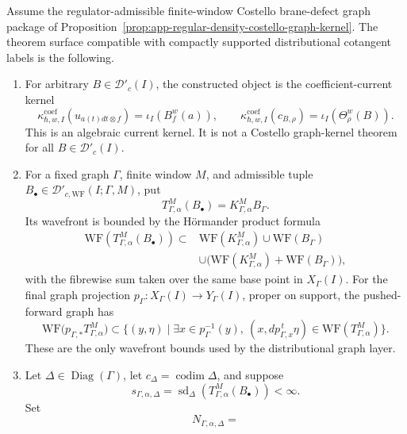 \begin{prop}
\label{prop:app-current-compatible-Dprimec-theorem-surface}
  Assume the regulator-admissible finite-window Costello brane-defect
  graph package of
  Proposition~\ref{prop:app-regular-density-costello-graph-kernel}.  The
  theorem surface compatible with compactly supported distributional
  cotangent labels is the following.
  \begin{enumerate}
    \item For arbitrary \(B\in\mathcal D'_c(I)\), the constructed object
    is the coefficient-current kernel
    \[
      \kappa^{\mathrm{coef}}_{\hbar,w,I}
        (u_{a(t)dt\otimes f})=\iota_I(B^w_f(a)),
      \qquad
      \kappa^{\mathrm{coef}}_{\hbar,w,I}(c_{B,\rho})
        =\iota_I(\Theta^w_\rho(B)).
    \]
    This is an algebraic current kernel.  It is not a Costello
    graph-kernel theorem for all \(B\in\mathcal D'_c(I)\).
    \item For a fixed graph \(\Gamma\), finite window \(M\), and
    admissible tuple
    \(B_\bullet\in\mathcal D'_{c,\mathrm{WF}}(I;\Gamma,M)\), put
    \[
      T^M_{\Gamma,\alpha}(B_\bullet)
        =K^M_{\Gamma,\alpha}B_\Gamma .
    \]
    Its wavefront is bounded by the H\"ormander product formula
    \[
    \begin{aligned}
      \mathrm{WF}\!\left(T^M_{\Gamma,\alpha}(B_\bullet)\right)
      \subset&
      \mathrm{WF}(K^M_{\Gamma,\alpha})
      \cup \mathrm{WF}(B_\Gamma)  \\
      &\cup
      \bigl(\mathrm{WF}(K^M_{\Gamma,\alpha})
        +\mathrm{WF}(B_\Gamma)\bigr),
    \end{aligned}
    \]
    with the fibrewise sum taken over the same base point in
    \(X_\Gamma(I)\).  For the final graph projection
    \(p_\Gamma:X_\Gamma(I)\to Y_\Gamma(I)\), proper on support, the
    pushed-forward graph has
    \[
      \mathrm{WF}\bigl(p_{\Gamma,*}T^M_{\Gamma,\alpha}\bigr)
      \subset
      \{(y,\eta)\mid
      \exists x\in p_\Gamma^{-1}(y),\
      (x,dp_{\Gamma,x}^{\,t}\eta)\in
      \mathrm{WF}(T^M_{\Gamma,\alpha})\}.
    \]
    These are the only wavefront bounds used by the distributional
    graph layer.
    \item Let \(\Delta\in\operatorname{Diag}(\Gamma)\), let
    \(c_\Delta=\operatorname{codim}\Delta\), and suppose
    \[
      s_{\Gamma,\alpha,\Delta}
        =\operatorname{sd}_\Delta
        \left(T^M_{\Gamma,\alpha}(B_\bullet)\right)<\infty .
    \]
    Set
    \[
      N_{\Gamma,\alpha,\Delta}
        =
\]
\end{enumerate}
\end{prop}
